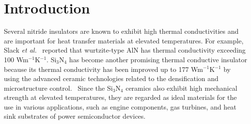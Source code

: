 \documentclass[twocolumn,amsmath,amssymb,a4paper,prb,superscriptaddress,floatfix]{revtex4-1}
\begin{document}
\maketitle

\section{Introduction}
Several nitride insulators are known to exhibit high thermal conductivities and
are important for heat transfer materials at elevated temperatures. For example,
Slack {\it et al.}~\cite{slack} reported that wurtzite-type AlN has thermal
conductivity exceeding 100 Wm$^{-1}$K$^{-1}$. Si$_3$N$_4$ has become another
promising thermal conductive insulator because its thermal conductivity has been
improved up to 177 Wm$^{-1}$K$^{-1}$ by using the advanced ceramic technologies
related to the densification and microstructure
control.~\cite{zhou,hirao-rev,watari,hirosaki} Since the Si$_3$N$_4$ ceramics
also exhibit high mechanical strength at elevated temperatures, they are
regarded as ideal materials for the use in various applications, such as engine
components, gas turbines, and heat sink substrates of power semiconductor
devices.
\end{document}
